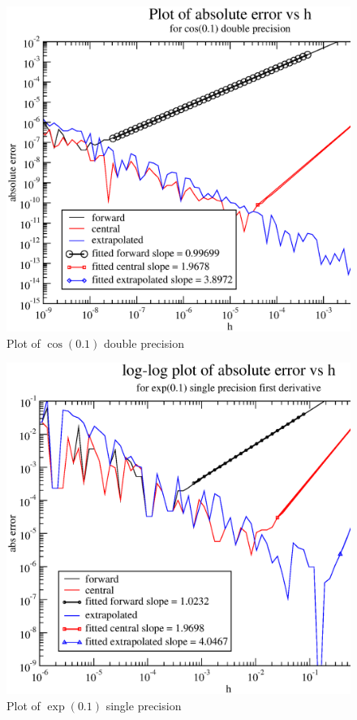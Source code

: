 \documentclass[11pt,a4paper,english]{article}
\begin{document}
	\begin{figure}[h!]
	\centering
	\includegraphics [scale=0.6]{cos01dp.eps}
	\caption{Plot of $ \cos(0.1) $ double precision }
	\end{figure}
	\clearpage
	
	\clearpage
	\begin{figure}[h!]
	\centering
	\includegraphics [scale=0.6]{exp01sp.eps}
	\caption{Plot of $ \exp(0.1)$ single precision }
	\end{figure}
	\clearpage
	
\end{document}
